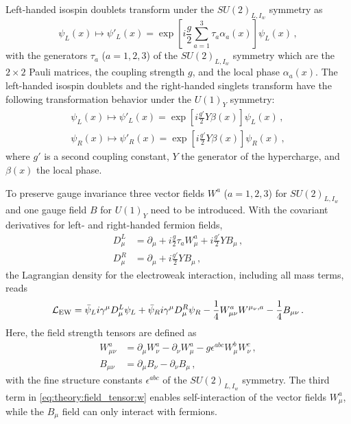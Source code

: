 Left-handed isospin doublets transform under the $SU{(2)}_{L,I_w}$ symmetry as
\begin{equation}
    \psi_L(x) \mapsto \psi'_L(x) = \exp \left[ i \frac{g}{2} \sum_{a=1}^{3} \tau_a \alpha_a(x) \right] \psi_L(x) \,,
\end{equation}
with the generators $\tau_a$ ($a = 1, 2, 3$) of the $SU{(2)}_{L,I_w}$ symmetry which are the $2\times 2$ Pauli matrices,
the coupling strength $g$, and the local phase $\alpha_a(x)$.
The left-handed isospin doublets and the right-handed singlets transform have the following transformation behavior under the $U{(1)}_Y$ symmetry:
\begin{gather}
    \psi_L(x) \mapsto \psi'_L(x) = \exp \left[ i \frac{g'}{2} Y \beta(x) \right] \psi_L(x) \,, \\
    \psi_R(x) \mapsto \psi'_R(x) = \exp \left[ i \frac{g'}{2} Y \beta(x) \right] \psi_R(x) \,,
\end{gather}
where $g'$ is a second coupling constant, $Y$ the generator of the hypercharge, and $\beta(x)$ the local phase.

To preserve gauge invariance three vector fields $W^a$ ($a = 1,2,3$) for $SU{(2)}_{L,I_w}$ and one gauge field $B$
for $U{(1)}_Y$ need to be introduced.
With the covariant derivatives for left- and right-handed fermion fields,
\begin{align}
    \label{eq:theory:ew:D}
    D_\mu^L &= \partial_\mu + i \frac{g}{2} \tau_a W_\mu^a + i \frac{g'}{2} Y B_\mu \,, \\
    D_\mu^R &= \partial_\mu + i \frac{g'}{2} Y B_\mu \,,
\end{align}
the Lagrangian density for the electroweak interaction, including all mass terms, reads
\begin{equation}
    \label{eq:theory:ew:l}
    \mathcal{L}_\text{EW} = \bar{\psi}_L i \gamma^\mu D_\mu^L \psi_L + \bar{\psi}_R i \gamma^\mu D_\mu^R \psi_R - \frac{1}{4} W_{\mu\nu}^a W^{\mu_\nu,a} - \frac{1}{4} B_{\mu\nu} \,.
\end{equation}
Here, the field strength tensors are defined as
\begin{align}
    \label{eq:theory:field_tensor:w}
    W_{\mu\nu}^a &= \partial_\mu W_\nu^a - \partial_\nu W_\mu^a - g \epsilon^{abc} W_\mu^b W_\nu^c \,, \\
    B_{\mu\nu}   &= \partial_\mu B_\nu - \partial_\nu B_\mu \,,
\end{align}
with the fine structure constants $\epsilon^{abc}$ of the $SU{(2)}_{L,I_w}$ symmetry.
The third term in \cref{eq:theory:field_tensor:w} enables self-interaction of the vector fields $W^a_\mu$, while the $B_\mu$ field
can only interact with fermions.

